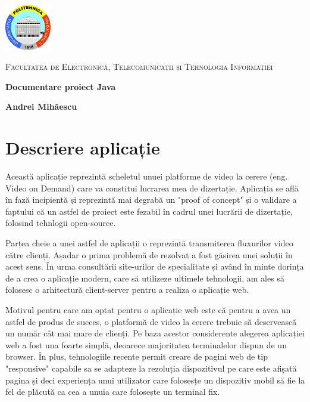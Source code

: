 \documentclass[12pt, a4paper, oneside, romanian]{teza-upb}
\begin{document}
\begin{titlepage}
	\centering
	\includegraphics[width=0.15\textwidth]{img/UPB-logo.png}\par\vspace{1cm}
	{\scshape\LARGE Facultatea de Electronică, Telecomunicații și Tehnologia Informației \par}
	\vspace{1cm}
	{\huge\bfseries Documentare proiect Java\par}
	\vspace{2cm}
	{\Large\bfseries Andrei Mihăescu\par}

\end{titlepage}
\newpage

\chapter{Descriere aplicație}	
Această aplicație reprezintă scheletul unuei platforme de video la cerere (eng. Video on Demand) care va constitui lucrarea mea de dizertație. Aplicația se află în fază incipientă și reprezintă mai degrabă un "proof of concept" și o validare a faptului că un astfel de proiect este fezabil în cadrul unei lucrării de dizertație, folosind tehnlogii open-source.

Parțea cheie a unei astfel de aplicații o reprezintă transmiterea fluxurilor video către clienți. Așadar o prima problemă de rezolvat a fost găsirea unei soluții în acest sens. În urma consultării site-urilor de specialitate și având în minte dorința de a crea o aplicație modern, care să utilizeze ultimele tehnologii, am ales să folosesc o arhitectură client-server pentru a realiza o aplicație web. 

Motivul pentru care am optat pentru o aplicație web este că pentru a avea un astfel de produs de succes, o platformă de video la cerere trebuie să deservească un număr cât mai mare de clienți. Pe baza acestor considerente alegerea aplicației web a fost una foarte simplă, deoarece majoritatea terminalelor dispun de un browser. În plus, tehnologiile recente permit creare de pagini web de tip "responsive" capabile sa se adapteze la rezoluția dispozitivul pe care este afișată pagina și deci experiența unui utilizator care folosesțe un dispozitiv mobil să fie la fel de plăcută ca cea a unuia care folosește un terminal fix.
\end{document}

